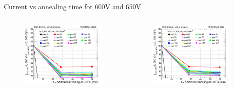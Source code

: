 \documentclass{beamer}
\begin{document}
\begin{frame}{Current vs annealing time for 600V and 650V}
  \begin{columns}
       \begin{figure}
           \includegraphics[width=1.0\textwidth]{plots/8in_198ch_2019_N4790_09_4E15_neg40degC_annealing_current_600.png}
       \end{figure}
       \begin{figure}
           \includegraphics[width=1.0\textwidth]{plots/8in_198ch_2019_N4790_09_4E15_neg40degC_annealing_current_650.png}
       \end{figure}
   \end{columns}
\end{frame}
\end{document}
